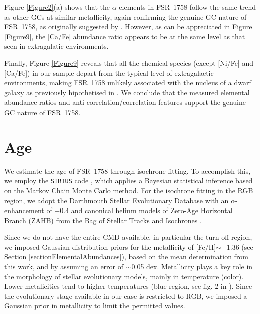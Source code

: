 \documentclass[longauth]{aa} %
\begin{document}
Figure \ref{Figure2}(a) shows that the $\alpha$ elements in FSR~1758 follow the same trend as other GCs at similar metallicity, again confirming the genuine GC nature of FSR~1758, as originally suggested by \citet{Villanova2019}. However, as can be appreciated in Figure \ref{Figure9}, the [Ca/Fe] abundance ratio appears to be at the same level as that seen in extragalatic environments.

Finally, Figure \ref{Figure9} reveals that all the chemical species (except [Ni/Fe] and [Ca/Fe]) in our sample depart from the typical  level of extragalactic environments, making FSR~1758 unlikely associated with the nucleus of a dwarf galaxy as previously hipothetised in \citep{Barba2019}. We conclude that the measured elemental abundance ratios and anti-correlation/correlation features support the genuine GC nature of FSR~1758. 

\section{Age}
\label{section4}

We estimate the age of FSR~1758 through isochrone fitting. To accomplish this, we employ the \texttt{SIRIUS} code \citep{Souza2020}, which applies a Bayesian statistical inference based on the Markov Chain Monte Carlo method. For the isochrone fitting in the RGB region, we adopt the Darthmouth Stellar Evolutionary Database \citep[DSED:][]{Dotter2008} with an $\alpha$-enhancement of $+0.4$ and canonical helium models of Zero-Age Horizontal Branch (ZAHB) from the Bag of Stellar Tracks and Isochrones \citep[BaSTI:][]{Pietrinferni2006}.

Since we do not have the entire CMD available, in particular the turn-off region, we imposed Gaussian distribution priors for the metallicity of [Fe/H]$\sim-1.36$ (see Section \ref{sectionElementalAbundances}), based on the mean determination from this work, and by assuming an error of $\sim$0.05 dex. Metallicity plays a key role in the morphology of stellar evolutionary models, mainly in temperature (color). Lower metalicities tend to higher temperatures (blue region, see fig. 2 in \citet{Souza2020}). Since the evolutionary stage available in our case is restricted to RGB, we imposed a Gaussian prior in metallicity to limit the permitted values.
\end{document}

